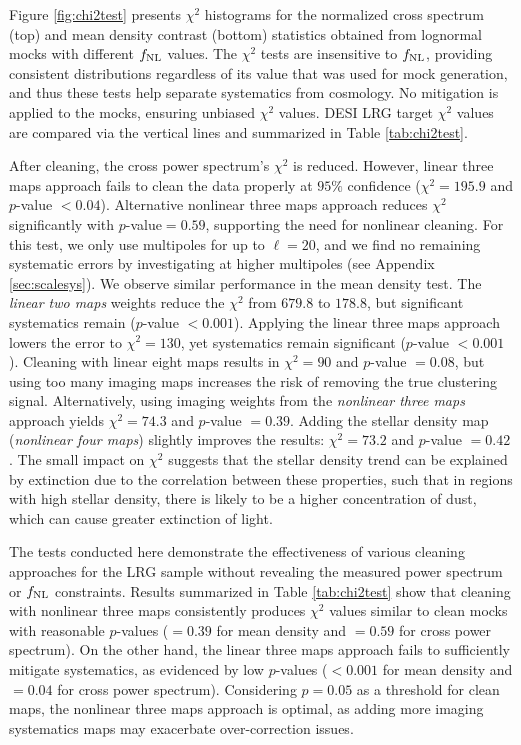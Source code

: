 Figure \ref{fig:chi2test} presents $\chi^{2}$ histograms for the normalized cross spectrum (top) and mean density contrast (bottom) statistics obtained from lognormal mocks with different $f_{\rm NL}$ values. The $\chi^{2}$ tests are insensitive to $f_{\rm NL}$, providing consistent distributions regardless of its value that was used for mock generation, and thus these tests help separate systematics from cosmology. No mitigation is applied to the mocks, ensuring unbiased $\chi^{2}$ values. DESI LRG target $\chi^{2}$ values are compared via the vertical lines and summarized in Table \ref{tab:chi2test}.

After cleaning, the cross power spectrum's $\chi^{2}$ is reduced. However, linear three maps approach fails to clean the data properly at $95\%$ confidence ($\chi^{2}=195.9$ and $p$-value $< 0.04$). Alternative nonlinear three maps approach reduces $\chi^{2}$ significantly with $p$-value$=0.59$, supporting the need for nonlinear cleaning. For this test, we only use multipoles for up to $\ell=20$, and we find no remaining systematic errors by investigating at higher multipoles (see Appendix \ref{sec:scalesys}). We observe similar performance in the mean density test. The \textit{linear two maps} weights reduce the $\chi^{2}$ from $679.8$ to $178.8$, but significant systematics remain ($p$-value $<0.001$). Applying the linear three maps approach lowers the error to $\chi^{2}=130$, yet systematics remain significant ($p$-value $<0.001$). Cleaning with linear eight maps results in $\chi^{2}=90$ and $p$-value $=0.08$, but using too many imaging maps increases the risk of removing the true clustering signal. Alternatively, using imaging weights from the \textit{nonlinear three maps} approach yields $\chi^{2}=74.3$ and $p$-value $=0.39$. Adding the stellar density map (\textit{nonlinear four maps}) slightly improves the results: $\chi^{2}=73.2$ and $p$-value $=0.42$. The small impact on $\chi^{2}$ suggests that the stellar density trend can be explained by extinction due to the correlation between these properties, such that in regions with high stellar density, there is likely to be a higher concentration of dust, which can cause greater extinction of light.

The tests conducted here demonstrate the effectiveness of various cleaning approaches for the LRG sample without revealing the measured power spectrum or $f_{\rm NL}$ constraints. Results summarized in Table \ref{tab:chi2test} show that cleaning with nonlinear three maps consistently produces $\chi^{2}$ values similar to clean mocks with reasonable $p$-values ($=0.39$ for mean density and $=0.59$ for cross power spectrum). On the other hand, the linear three maps approach fails to sufficiently mitigate systematics, as evidenced by low $p$-values ($< 0.001$ for mean density and $=0.04$ for cross power spectrum). Considering $p=0.05$ as a threshold for clean maps, the nonlinear three maps approach is optimal, as adding more imaging systematics maps may exacerbate over-correction issues.


